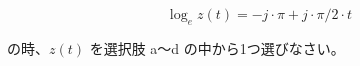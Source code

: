 \noindent 

\[
\log_e z(t) = -j \cdot \pi + j \cdot \pi/2 \cdot t
\]

\bigskip
\noindent の時、$z(t)$ を選択肢 a〜d の中から1つ選びなさい。
